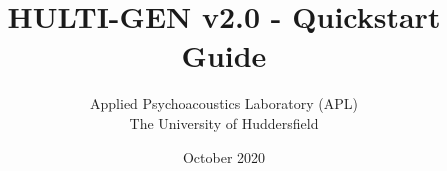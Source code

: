 \documentclass[oneside, a4paper,12pt]{book}
\begin{document}
\author{Applied Psychoacoustics Laboratory (APL) \\ The University of Huddersfield}
\title{HULTI-GEN v2.0 - Quickstart Guide}
\date{October 2020}

\maketitle
\cleardoublepage
\tableofcontents




\end{document}
